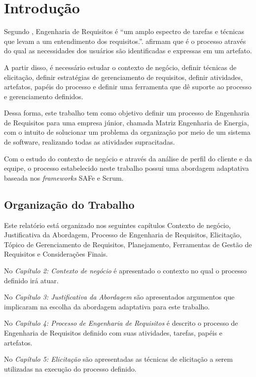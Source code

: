 \chapter[Introdução]{Introdução}

Segundo , Engenharia de Requisitos é ``um amplo
espectro de tarefas e técnicas que levam a um entendimento dos requisitos.''.
 afirmam que é o processo através do qual as necessidades dos usuários 
são identificadas e expressas em um artefato.

A partir disso, é necessário estudar o contexto de negócio, definir técnicas de elicitação, 
definir estratégias de gerenciamento de requisitos, definir atividades, artefatos, papéis do processo
e definir uma ferramenta que dê suporte ao processo e gerenciamento definidos.

Dessa forma, este trabalho tem como objetivo definir um processo de Engenharia de Requisitos para uma empresa júnior, chamada
Matriz Engenharia de Energia, com o intuito de solucionar um problema da organização por meio de um sistema de software,
realizando todas as atividades supracitadas.

Com o estudo do contexto de negócio e através da análise de perfil do cliente e da equipe, o processo
estabelecido neste trabalho possui uma abordagem adaptativa baseada nos \textit{frameworks} SAFe e Scrum.

\section{Organização do Trabalho}

Este relatório está organizado nos seguintes capítulos Contexto de negócio, Justificativa da Abordagem, 
Processo de Engenharia de Requisitos, Elicitação, Tópico de Gerenciamento de Requisitos,
Planejamento, Ferramentas de Gestão de Requisitos e Considerações Finais.

No \textit{Capítulo 2: Contexto de negócio} é apresentado o contexto no qual o processo
definido irá atuar.

No \textit{Capítulo 3: Justificativa da Abordagem} são apresentados argumentos
que implicaram na escolha da abordagem adaptativa para este trabalho.

No \textit{Capítulo 4: Processo de Engenharia de Requisitos} é descrito o processo de Engenharia
de Requisitos definido com suas atividades, tarefas, papéis e artefatos.

No \textit{Capítulo 5: Elicitação} são apresentadas as técnicas de elicitação
a serem utilizadas na execução do processo definido.

